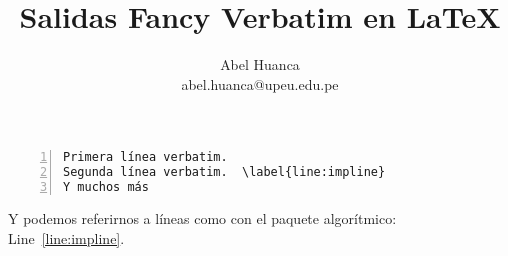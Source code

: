 \documentclass{article}
\begin{document}
\title{Salidas Fancy Verbatim en \LaTeX}
\author{Abel Huanca \\ abel.huanca@upeu.edu.pe}
\maketitle

\begin{Verbatim}[frame=single, label=Some Label, numbers=left, commandchars=\\\{\}]
Primera línea verbatim. 
Segunda línea verbatim.  \label{line:impline}
Y muchos más
\end{Verbatim}



Y podemos referirnos a líneas como con el paquete algorítmico: Line~\ref{line:impline}.
\end{document}
